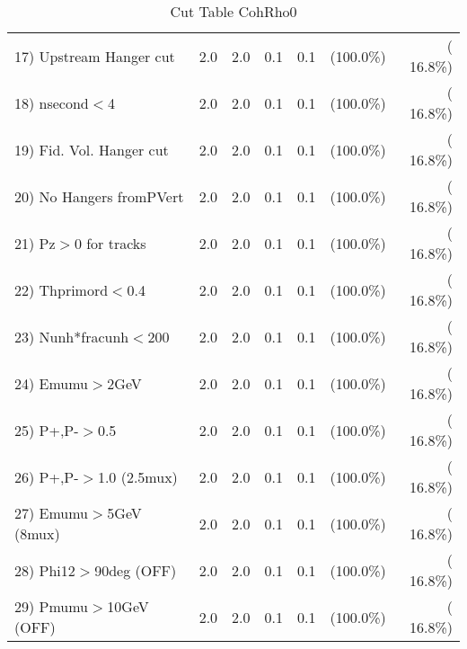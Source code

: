 \begin{table}[h!]
\begin{tabular}{||l||r|r|r|r|r|r||}
 17) Upstream Hanger cut  &          2.0 &          2.0 &          0.1 &          0.1 & (100.0\%) & ( 16.8\%) \\
 18) nsecond$<$4          &          2.0 &          2.0 &          0.1 &          0.1 & (100.0\%) & ( 16.8\%) \\
 19) Fid. Vol. Hanger cut &          2.0 &          2.0 &          0.1 &          0.1 & (100.0\%) & ( 16.8\%) \\
 20) No Hangers fromPVert &          2.0 &          2.0 &          0.1 &          0.1 & (100.0\%) & ( 16.8\%) \\
 21) Pz$>$0 for tracks    &          2.0 &          2.0 &          0.1 &          0.1 & (100.0\%) & ( 16.8\%) \\
 22) Thprimord$<$0.4      &          2.0 &          2.0 &          0.1 &          0.1 & (100.0\%) & ( 16.8\%) \\
 23) Nunh*fracunh$<$200   &          2.0 &          2.0 &          0.1 &          0.1 & (100.0\%) & ( 16.8\%) \\
 24) Emumu$>$2GeV         &          2.0 &          2.0 &          0.1 &          0.1 & (100.0\%) & ( 16.8\%) \\
 25) P+,P-$>$0.5          &          2.0 &          2.0 &          0.1 &          0.1 & (100.0\%) & ( 16.8\%) \\
 26) P+,P-$>$1.0 (2.5mux) &          2.0 &          2.0 &          0.1 &          0.1 & (100.0\%) & ( 16.8\%) \\
 27) Emumu$>$5GeV  (8mux) &          2.0 &          2.0 &          0.1 &          0.1 & (100.0\%) & ( 16.8\%) \\
 28) Phi12$>$90deg  (OFF) &          2.0 &          2.0 &          0.1 &          0.1 & (100.0\%) & ( 16.8\%) \\
 29) Pmumu$>$10GeV  (OFF) &          2.0 &          2.0 &          0.1 &          0.1 & (100.0\%) & ( 16.8\%) \\
 \hline
 \hline
 \end{tabular}
 \caption{Cut Table  CohRho0  }
 \label{tab-cutcohjpsi-mumu_cohrho0}
 \end{table}
